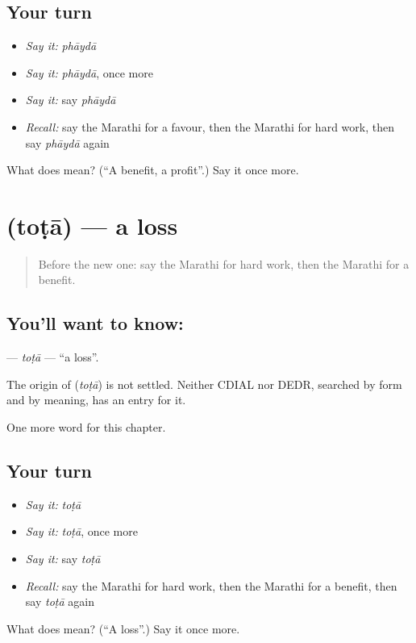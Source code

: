 \subsection*{Your turn}
\begin{itemize}
\raggedright
  \item \emph{Say it:} \emph{phāydā}
  \item \emph{Say it:} \emph{phāydā}, once more
  \item \emph{Say it:} say \emph{phāydā}
  \item \emph{Recall:} say the Marathi for a favour, then the Marathi for hard work, then say \emph{phāydā} again
\end{itemize}

\begin{tcolorbox}[breakable,colback=teal!4,colframe=teal!35!black,title={Before you move on}]
What does  mean? (\textquotedblleft{}A benefit, a profit\textquotedblright{}.) Say it once more.
\end{tcolorbox}
\section[\texorpdfstring{\mr{तोटा} (toṭā)}{तोटा (toṭā)}]{ (toṭā) — a loss}

\label{lesson:MR-C189-tota}



\begin{quote}
Before the new one: say the Marathi for hard work, then the Marathi for a benefit.
\end{quote}

\subsection*{You'll want to know: }
\textbf{} — \emph{toṭā} — \textquotedblleft{}a loss\textquotedblright{}.

\begin{cousinweb}
The origin of \textbf{} (\emph{toṭā}) is not settled. Neither CDIAL nor DEDR, searched by form and by meaning, has an entry for it.
\end{cousinweb}

\begin{grammarlens}[title={What you've built}]
One more word for this chapter.
\end{grammarlens}

\subsection*{Your turn}
\begin{itemize}
\raggedright
  \item \emph{Say it:} \emph{toṭā}
  \item \emph{Say it:} \emph{toṭā}, once more
  \item \emph{Say it:} say \emph{toṭā}
  \item \emph{Recall:} say the Marathi for hard work, then the Marathi for a benefit, then say \emph{toṭā} again
\end{itemize}

\begin{tcolorbox}[breakable,colback=teal!4,colframe=teal!35!black,title={Before you move on}]
What does  mean? (\textquotedblleft{}A loss\textquotedblright{}.) Say it once more.
\end{tcolorbox}
